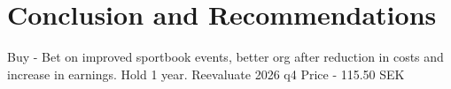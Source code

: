 \documentclass[a4paper, 11pt, oneside]{article} %
\begin{document}
\section{Conclusion and Recommendations}
Buy - Bet on improved sportbook events, better org after reduction in costs and increase in earnings. Hold 1 year. Reevaluate 2026 q4
Price - 115.50 SEK
\end{document}

